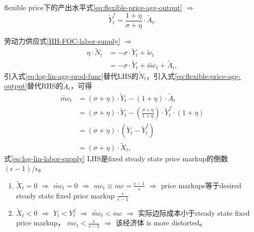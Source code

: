 flexible price下的产出水平式\eqref{eq:flexible-price-agg-output} $\Rightarrow$
\begin{equation}
  \label{eq:log-lin-flexible-price-output}
  \tilde{Y}_t^f = \frac{1+\eta}{\sigma + \eta} \cdot \tilde{A}_t.
\end{equation}

劳动力供应式\eqref{HH-FOC-labor-supply} $\Rightarrow$
\begin{align*}
    \eta \cdot \tilde{N}_t &= -\sigma \cdot \tilde{Y}_t + \tilde{w}_t \nonumber \\
                           &= -\sigma \cdot \tilde{Y}_t + \tilde{mc}_t + \tilde{A}_t,
\end{align*}
引入式\eqref{eq:log-lin-agg-prod-func}替代LHS的$\tilde{N}_t$，引入式\eqref{eq:flexible-price-agg-output}替代RHS的$\tilde{A}_t$，可得
\begin{align}
  \label{eq:log-lin-labor-supply}
  \tilde{mc}_t &= \left(\sigma + \eta \right) \cdot \tilde{Y}_t - (1+\eta) \cdot \tilde{A}_t \nonumber \\
               &= (\sigma + \eta) \cdot \tilde{Y}_t - \left(\frac{\sigma + \eta}{1+\eta} \right) \cdot \tilde{Y}^f_t \cdot (1+\eta)\nonumber \\
               &= (\sigma + \eta) \cdot \left(\tilde{Y}_t - \tilde{Y}^f_t \right) \nonumber \\
               &= (\sigma + \eta) \cdot \tilde{X}_t,
\end{align}
式\eqref{eq:log-lin-labor-supply} LHS是fixed steady state price markup的倒数$(\epsilon - 1 )/\epsilon$。
\begin{enumerate}
\item $\tilde{X}_t = 0$ $\Rightarrow$ $\tilde{mc}_t = 0$ $\Rightarrow$ $mc_t \equiv mc = \frac{\epsilon-1}{\epsilon}$ $\Rightarrow$ price markups等于desired steady state fixed price markup $\frac{\epsilon}{\epsilon -1}$
\item $\tilde{X}_t <0$ $\Rightarrow$ $Y_t < Y_t^f$ $\Rightarrow$ $\tilde{mc}_t < mc$ $\Rightarrow$ 实际边际成本小于steady state fixed price markup， $mc_t < \frac{\epsilon}{\epsilon -1}$ $\Rightarrow$ 该经济体 is more distorted。
\end{enumerate}

